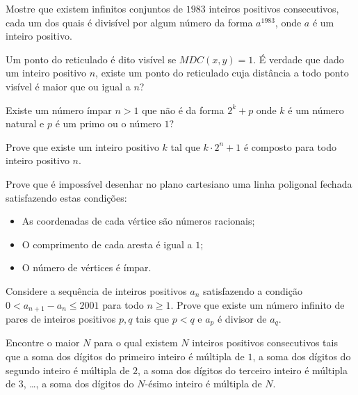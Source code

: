 \begin{questao}
  Mostre que existem infinitos conjuntos de $1983$ inteiros
  positivos consecutivos, cada um dos quais é divisível por algum número
  da forma $a^{1983}$, onde $a$ é um inteiro positivo.

\end{questao}

\begin{questao}
  Um ponto do reticulado é dito visível se $MDC(x,y)=1$. É
  verdade que dado um inteiro positivo $n$, existe um ponto do
  reticulado cuja distância a todo ponto visível é maior que ou igual a
  $n$?

\end{questao}

\begin{questao}
  Existe um número ímpar $n > 1$ que não é da forma
  $2^k+p$ onde $k$ é um número natural e $p$ é um primo ou o
  número $1$?

\end{questao}

\begin{questao}
  Prove que existe um inteiro positivo $k$ tal que
  $k \cdot 2^n+1$ é composto para todo inteiro positivo $n$.

\end{questao}

\begin{questao}
  Prove que é impossível desenhar no plano cartesiano uma
  linha poligonal fechada satisfazendo estas condições:

  \begin{itemize}
    \item As coordenadas de cada vértice são números racionais;

    \item O comprimento de cada aresta é igual a $1$;

    \item O número de vértices é ímpar.
  \end{itemize}

\end{questao}

\begin{questao}
  Considere a sequência de inteiros positivos $a_n$ satisfazendo a
  condição $0 < a_{n+1}-a_n \leq 2001$ para todo $n \geq 1$. Prove
  que existe um número infinito de pares de inteiros positivos $p,q$
  tais que $p<q$ e $a_p$ é divisor de $a_q$.
\end{questao}

\begin{questao}
  Encontre o maior $N$ para o qual existem $N$ inteiros positivos
  consecutivos tais que a soma dos dígitos do primeiro inteiro é
  múltipla de $1$, a soma dos dígitos do segundo inteiro é múltipla
  de $2$, a soma dos dígitos do terceiro inteiro é múltipla de
  $3$, \ldots, a soma dos dígitos do $N$-ésimo inteiro é múltipla
  de $N$.
\end{questao}


